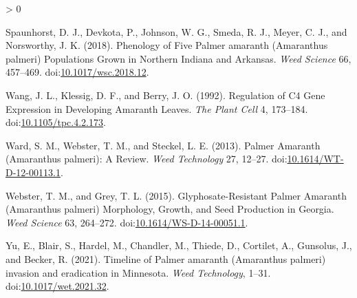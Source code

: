 \documentclass[utf8]{frontiersSCNS}
\newlength{\cslhangindent}
\newenvironment{CSLReferences}[2] %
 {%
  \setlength{\parindent}{0pt}
  \ifodd #1 \everypar{\setlength{\hangindent}{\cslhangindent}}\ignorespaces\fi
  \ifnum #2 > 0
  \setlength{\parskip}{#2\baselineskip}
  \fi
 }%
 {}
\begin{document}
\begin{CSLReferences}{1}{0}
\leavevmode\hypertarget{ref-spaunhorst2018}{}%
Spaunhorst, D. J., Devkota, P., Johnson, W. G., Smeda, R. J., Meyer, C.
J., and Norsworthy, J. K. (2018). Phenology of {Five Palmer} amaranth
({Amaranthus} palmeri) {Populations Grown} in {Northern Indiana} and
{Arkansas}. \emph{Weed Science} 66, 457--469.
doi:\href{https://doi.org/10.1017/wsc.2018.12}{10.1017/wsc.2018.12}.

\leavevmode\hypertarget{ref-wang1992}{}%
Wang, J. L., Klessig, D. F., and Berry, J. O. (1992). Regulation of {C4
Gene Expression} in {Developing Amaranth Leaves}. \emph{The Plant Cell}
4, 173--184.
doi:\href{https://doi.org/10.1105/tpc.4.2.173}{10.1105/tpc.4.2.173}.

\leavevmode\hypertarget{ref-ward2013}{}%
Ward, S. M., Webster, T. M., and Steckel, L. E. (2013). Palmer
{Amaranth} ({Amaranthus} palmeri): {A Review}. \emph{Weed Technology}
27, 12--27.
doi:\href{https://doi.org/10.1614/WT-D-12-00113.1}{10.1614/WT-D-12-00113.1}.

\leavevmode\hypertarget{ref-webster2015}{}%
Webster, T. M., and Grey, T. L. (2015). Glyphosate-{Resistant Palmer
Amaranth} ({Amaranthus} palmeri) {Morphology}, {Growth}, and {Seed
Production} in {Georgia}. \emph{Weed Science} 63, 264--272.
doi:\href{https://doi.org/10.1614/WS-D-14-00051.1}{10.1614/WS-D-14-00051.1}.

\leavevmode\hypertarget{ref-yu2021}{}%
Yu, E., Blair, S., Hardel, M., Chandler, M., Thiede, D., Cortilet, A.,
Gunsolus, J., and Becker, R. (2021). Timeline of {Palmer} amaranth
({Amaranthus} palmeri) invasion and eradication in {Minnesota}.
\emph{Weed Technology}, 1--31.
doi:\href{https://doi.org/10.1017/wet.2021.32}{10.1017/wet.2021.32}.

\end{CSLReferences}
\end{document}
